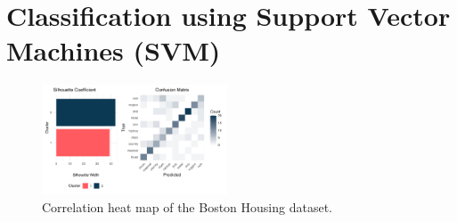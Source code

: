 \documentclass[twocolumn]{article}
\begin{document}
\section{Classification using Support Vector Machines (SVM)}
\begin{figure}[hht]
	\centering
	\includegraphics[width=0.49\textwidth]{images/clust_class.pdf}
  \caption{Correlation heat map of the Boston Housing dataset.}
	\label{fig:corr}
\end{figure}
\blindtext

\end{document}
